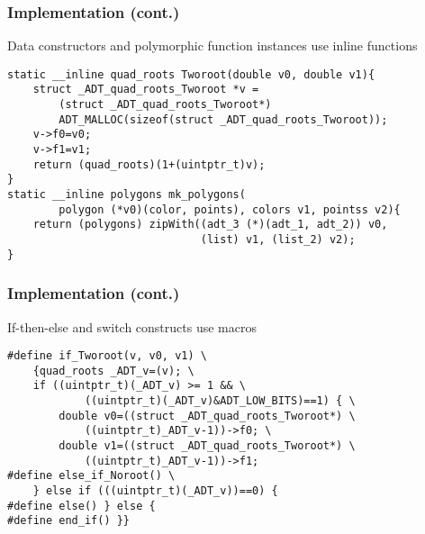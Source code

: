 \documentclass[t,t]{beamer}
\begin{document}
\begin{frame}[fragile]
\frametitle{Implementation (cont.)}
Data constructors and polymorphic function instances use
inline functions
\begin{verbatim}
static __inline quad_roots Tworoot(double v0, double v1){
    struct _ADT_quad_roots_Tworoot *v =
        (struct _ADT_quad_roots_Tworoot*)
        ADT_MALLOC(sizeof(struct _ADT_quad_roots_Tworoot));
    v->f0=v0;
    v->f1=v1;
    return (quad_roots)(1+(uintptr_t)v);
}
static __inline polygons mk_polygons(
        polygon (*v0)(color, points), colors v1, pointss v2){
    return (polygons) zipWith((adt_3 (*)(adt_1, adt_2)) v0,
                              (list) v1, (list_2) v2);
}
\end{verbatim}
\end{frame}

\begin{frame}[fragile]
\frametitle{Implementation (cont.)}
If-then-else and switch constructs use macros
\begin{verbatim}
#define if_Tworoot(v, v0, v1) \
    {quad_roots _ADT_v=(v); \
    if ((uintptr_t)(_ADT_v) >= 1 && \
            ((uintptr_t)(_ADT_v)&ADT_LOW_BITS)==1) { \
        double v0=((struct _ADT_quad_roots_Tworoot*) \
            ((uintptr_t)_ADT_v-1))->f0; \
        double v1=((struct _ADT_quad_roots_Tworoot*) \
            ((uintptr_t)_ADT_v-1))->f1;
#define else_if_Noroot() \
    } else if (((uintptr_t)(_ADT_v))==0) {
#define else() } else {
#define end_if() }}
\end{verbatim}
\end{frame}
\end{document}
